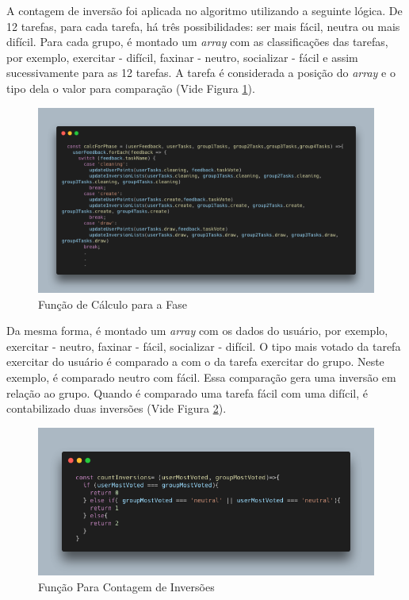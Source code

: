 A contagem de inversão foi aplicada no algoritmo utilizando a seguinte lógica. 
De 12 tarefas, para cada tarefa, 
há três possibilidades: ser mais fácil, neutra ou mais difícil. Para cada grupo, é montado um \emph{array} 
com as classificações das tarefas, por exemplo, exercitar - difícil, faxinar - neutro, socializar - fácil e assim 
sucessivamente para as 12 tarefas. A tarefa é considerada a posição do \emph{array} 
e o tipo dela o valor para comparação (Vide Figura \ref{fig16}).

\begin{figure}[ht]
	\caption{Função de Cálculo para a Fase}
	\begin{center}
	\includegraphics[keepaspectratio=true,scale=0.3]{figuras/code-calForPhase.png}
	\end{center}
    \label{fig16}
\end{figure}

Da mesma forma, é montado um \emph{array} com os dados 
do usuário, por exemplo, exercitar - neutro, 
faxinar - fácil, socializar - difícil. O tipo mais votado da tarefa exercitar do usuário é comparado a com o da tarefa 
exercitar do grupo. 
Neste exemplo, é comparado neutro com fácil. Essa comparação gera uma inversão em relação ao grupo. 
Quando é comparado uma tarefa fácil com uma difícil, é contabilizado duas inversões (Vide Figura \ref{fig18}). 

\begin{figure}[ht]
	\caption{Função Para Contagem de Inversões}
	\begin{center}
	\includegraphics[keepaspectratio=true,scale=0.4]{figuras/code-countInversions.png}
	\end{center}
    \label{fig18}
\end{figure}


